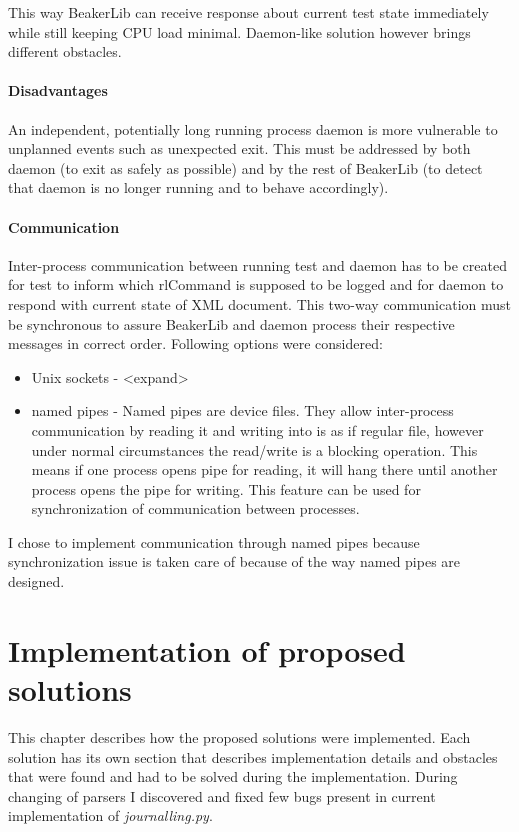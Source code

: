 This way BeakerLib can receive response about current test state immediately while still keeping CPU load minimal. Daemon-like solution however brings different obstacles.

\subsubsection{Disadvantages}
An independent, potentially long running process daemon is more vulnerable to unplanned events such as unexpected exit. This must be addressed by both daemon (to exit as safely as possible)  and by the rest of BeakerLib (to detect that daemon is no longer running and to behave accordingly). 

\subsubsection{Communication}
Inter-process communication between running test and daemon has to be created for test to inform which rlCommand is supposed to be logged and for daemon to respond with current state of XML document. This two-way communication must be synchronous to assure BeakerLib and daemon process their respective messages in correct order. Following options were considered:

\begin{itemize}
\item Unix sockets  -  <expand>
\item named pipes - Named pipes are device files. They allow inter-process communication by reading it and writing into is as if regular file, however under normal circumstances the read/write is a blocking operation\cite{pipes_blocking}. This means if one process opens pipe for reading, it will hang there until another process opens the pipe for writing. This feature can be used for synchronization of communication between processes. 
\end{itemize}

I chose to implement communication through named pipes because synchronization issue is taken care of because of the way named pipes are designed.


\chapter{Implementation of proposed solutions}
\label{implementations}
This chapter describes how the proposed solutions were implemented. Each solution has its own section that describes implementation details and obstacles that were found and had to be solved during the implementation.
During changing of parsers I discovered and fixed few bugs present in current implementation of \textit{journalling.py}.

